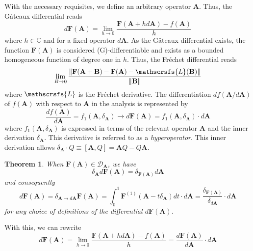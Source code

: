 \documentclass[a4paper]{article}
\newtheorem{theorem}{Theorem}[section]
\theoremstyle{definition}
\begin{document}
With the necessary requisites, we define an arbitrary operator $\textbf{A}$. Thus, the Gâteaux differential reads
\begin{equation}
	d\textbf{F}(\textbf{A})=\lim_{h\to0}\frac{\textbf{F}(\textbf{A}+hd\textbf{A})-f(\textbf{A})}{h}
\end{equation}
where $h\in\mathbb{C}$ and for a fixed operator $d\textbf{A}$. As the Gâteaux differential exists, the function $\textbf{F}(\textbf{A})$ is considered (G)-differentiable and exists as a bounded homogeneous function of degree one in $h$. Thus, the Fréchet differential reads
\begin{equation}
	\lim_{B\to0}\frac{\|\textbf{F}(\textbf{A}+\textbf{B})-\textbf{F}(\textbf{A})-\mathscrsfs{L}(\textbf{B})\|}{\|\textbf{B}\|}
\end{equation}
where $\mathscrsfs{L}$ is the Fréchet derivative. The differentiation $df(\textbf{A}/d\textbf{A})$ of $f(\textbf{A})$ with respect to $\textbf{A}$ in the analysis is represented by
\begin{equation}
	\frac{df(\textbf{A})}{d\textbf{A}}=f_1(\textbf{A},\delta_\textbf{A})\to d\textbf{F}(\textbf{A})=f_1(\textbf{A},\delta_\textbf{A})\cdot d\textbf{A}
\end{equation}
where $f_1(\textbf{A},\delta_\textbf{A})$ is expressed in terms of the relevant operator $\textbf{A}$ and the inner derivation $\delta_\textbf{A}$. This derivative is referred to as a \textit{hyperoperator}. This inner derivation allows $\delta_\textbf{A}\cdot Q\equiv[\textbf{A},Q]=\textbf{A}Q-Q\textbf{A}$.
\begin{theorem}
	When $\textbf{F}(\textbf{A})\in\mathcal{D}_\textbf{A}$, we have
	\begin{equation}
		\delta_\textbf{A}d\textbf{F}(\textbf{A})=\delta_{\textbf{F}(\textbf{A})}d\textbf{A}
	\end{equation}
	and consequently
	\begin{equation}
		d\textbf{F}(\textbf{A})=\delta_{\textbf{A}\to d\textbf{A}}\textbf{F}(\textbf{A})=\int_0^1\textbf{F}^{(1)}(\textbf{A}-t\delta_\textbf{A})dt\cdot d\textbf{A}=\frac{\delta_{\textbf{F}(\textbf{A})}}{\delta_{d\textbf{A}}}\cdot d\textbf{A}
	\end{equation}
	for any choice of definitions of the diﬀerential $d\textbf{F}(\textbf{A})$.
\end{theorem}
With this, we can rewrite
\begin{equation}
	d\textbf{F}(\textbf{A})=\lim_{h\to0}\frac{\textbf{F}(\textbf{A}+hd\textbf{A})-f(\textbf{A})}{h}=\frac{d\textbf{F}(\textbf{A})}{d\textbf{A}}\cdot d\textbf{A}
\end{equation}
\end{document}
